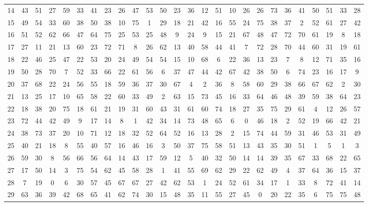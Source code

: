 \begin{table}
\begin{tabular}{c c c c c c c c c c c c c c c c c c c c c c c c c c }
14 & 43 & 51 & 27 & 59 & 33 & 41 & 23 & 26 & 47 & 53 & 50 & 23 & 36 & 12 & 51 & 10 & 26 & 26 & 73 & 36 & 41 & 50 & 51 & 33 & 28 \\
15 & 49 & 54 & 33 & 60 & 38 & 50 & 38 & 10 & 75 & 1 & 29 & 18 & 21 & 42 & 16 & 55 & 24 & 75 & 38 & 37 & 2 & 52 & 61 & 27 & 42 \\
16 & 51 & 52 & 62 & 66 & 47 & 64 & 75 & 25 & 53 & 25 & 48 & 9 & 24 & 9 & 15 & 21 & 67 & 48 & 47 & 72 & 70 & 61 & 19 & 8 & 18 \\
17 & 27 & 11 & 21 & 13 & 60 & 23 & 72 & 71 & 8 & 26 & 62 & 13 & 40 & 58 & 44 & 41 & 7 & 72 & 28 & 70 & 44 & 60 & 31 & 19 & 61 \\
18 & 22 & 46 & 25 & 47 & 22 & 53 & 20 & 24 & 49 & 54 & 54 & 15 & 10 & 68 & 6 & 22 & 36 & 13 & 23 & 7 & 8 & 12 & 71 & 35 & 16 \\
19 & 50 & 28 & 70 & 7 & 52 & 33 & 66 & 22 & 61 & 56 & 6 & 37 & 47 & 44 & 42 & 67 & 42 & 38 & 50 & 6 & 74 & 23 & 16 & 17 & 9 \\
20 & 37 & 68 & 22 & 24 & 56 & 55 & 18 & 59 & 36 & 37 & 30 & 67 & 4 & 2 & 36 & 8 & 58 & 60 & 29 & 38 & 66 & 67 & 62 & 2 & 30 \\
21 & 13 & 25 & 17 & 10 & 65 & 58 & 22 & 60 & 33 & 49 & 2 & 63 & 15 & 73 & 45 & 16 & 33 & 64 & 46 & 48 & 39 & 59 & 38 & 64 & 23 \\
22 & 18 & 38 & 20 & 75 & 18 & 61 & 21 & 19 & 31 & 60 & 43 & 31 & 61 & 60 & 74 & 18 & 27 & 35 & 75 & 29 & 61 & 4 & 12 & 26 & 57 \\
23 & 72 & 44 & 42 & 49 & 9 & 17 & 14 & 8 & 1 & 42 & 34 & 14 & 73 & 48 & 65 & 6 & 0 & 46 & 18 & 2 & 52 & 19 & 66 & 42 & 21 \\
24 & 38 & 73 & 37 & 20 & 10 & 71 & 12 & 18 & 32 & 52 & 64 & 52 & 16 & 13 & 28 & 2 & 15 & 74 & 44 & 59 & 31 & 46 & 53 & 31 & 49 \\
25 & 40 & 21 & 18 & 8 & 55 & 40 & 57 & 16 & 46 & 16 & 3 & 50 & 37 & 75 & 58 & 51 & 13 & 43 & 35 & 30 & 51 & 1 & 5 & 1 & 3 \\
26 & 59 & 30 & 8 & 56 & 66 & 56 & 64 & 14 & 43 & 17 & 59 & 12 & 5 & 40 & 32 & 50 & 14 & 14 & 39 & 35 & 67 & 33 & 68 & 22 & 65 \\
27 & 17 & 50 & 14 & 3 & 75 & 54 & 62 & 45 & 58 & 28 & 1 & 41 & 55 & 69 & 62 & 29 & 22 & 62 & 49 & 4 & 37 & 64 & 36 & 15 & 37 \\
28 & 7 & 19 & 0 & 6 & 30 & 57 & 45 & 67 & 67 & 27 & 42 & 62 & 53 & 1 & 24 & 52 & 61 & 34 & 17 & 1 & 33 & 8 & 72 & 41 & 14 \\
29 & 63 & 36 & 39 & 42 & 68 & 65 & 41 & 62 & 74 & 30 & 15 & 48 & 35 & 11 & 55 & 27 & 45 & 0 & 20 & 22 & 35 & 6 & 75 & 75 & 48 \\

\end{tabular}
\end{table}
